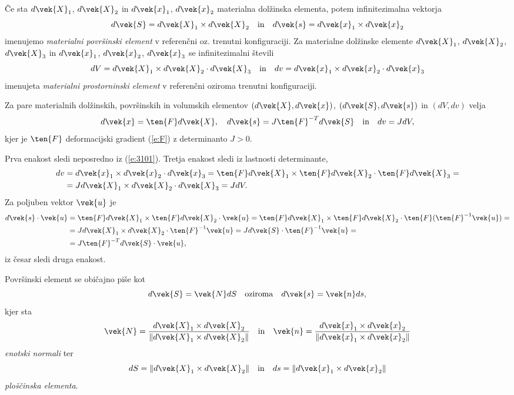 \begin{definicija}
	Če sta $d\vek{X}_1$, $d\vek{X}_2$ in $d\vek{x}_1$, $d\vek{x}_2$ materialna dolžinska elementa,
	potem infinitezimalna vektorja
	\[ d\vek{S}= d\vek{X}_1\times d\vek{X}_2\quad\mathrm{in}\quad d\vek{s}= d\vek{x}_1\times d\vek{x}_2 \]
	imenujemo \emph{materialni površinski element} v referenčni oz. trenutni konfiguraciji.
	Za materialne dolžinske elemente $d\vek{X}_1$, $d\vek{X}_2$, $d\vek{X}_3$
	in $d\vek{x}_1$, $d\vek{x}_2$, $d\vek{x}_3$ se infinitezimalni števili
	\[ dV= d\vek{X}_1\times d\vek{X}_2\cdot d\vek{X}_3\quad\mathrm{in}\quad dv= d\vek{x}_1\times d\vek{x}_2\cdot d\vek{x}_3 \]
	imenujeta \emph{materialni prostorninski element} v referenčni oziroma trenutni konfiguraciji.
\end{definicija}
\begin{trditev}
	Za pare materialnih dolžinskih, površinskih in volumskih elementov $(d\vek{X},d\vek{x})$, $(d\vek{S},d\vek{s})$ in $(dV,dv)$ velja
	\begin{equation}\label{e:dxdX}
		d\vek{x}=\ten{F}d\vek{X},\quad d\vek{s}=J\ten{F}^{-T}d\vek{S}\quad\mathrm{in}\quad
		dv=JdV,
	\end{equation}
	kjer je $\ten{F}$ deformacijski gradient (\ref{e:F}) z determinanto $J>0$.
\end{trditev}
\proof
	Prva enakost sledi neposredno iz (\ref{e:3101}). Tretja enakost sledi iz lastnosti determinante,
	\begin{align*}
		dv&=d\vek{x}_1\times d\vek{x}_2\cdot d\vek{x}_3=
		\ten{F}d\vek{X}_1\times \ten{F}d\vek{X}_2\cdot \ten{F}d\vek{X}_3=\\
		&=Jd\vek{X}_1\times d\vek{X}_2\cdot d\vek{X}_3 = JdV.
	\end{align*}
	Za poljuben vektor $\vek{u}$ je
	\begin{align*}
		d\vek{s}\cdot\vek{u}&=\ten{F}d\vek{X}_1\times\ten{F}d\vek{X}_2\cdot\vek{u}=
		\ten{F}d\vek{X}_1\times\ten{F}d\vek{X}_2\cdot\ten{F}(\ten{F}^{-1}\vek{u})=\\
		&=J d\vek{X}_1\times d\vek{X}_2 \cdot \ten{F}^{-1}\vek{u} =J d\vek{S}\cdot\ten{F}^{-1}\vek{u}=\\
		&=J\ten{F}^{-T}d\vek{S}\cdot\vek{u},
	\end{align*}
	iz česar sledi druga enakost. 
\endproof

Površinski element se običajno piše kot
\[ d\vek{S}=\vek{N}dS \quad\mathrm{oziroma}\quad d\vek{s}=\vek{n}ds, \]
kjer sta
\[
	\vek{N}=\frac{d\vek{X}_1\times d\vek{X}_2}{\|d\vek{X}_1\times d\vek{X}_2\|} \quad\mathrm{in}\quad
	\vek{n}=\frac{d\vek{x}_1\times d\vek{x}_2}{\|d\vek{x}_1\times d\vek{x}_2\|}
\]
\emph{enotski normali} ter
\[ dS=\|d\vek{X}_1\times d\vek{X}_2\| \quad\mathrm{in}\quad ds=\|d\vek{x}_1\times d\vek{x}_2\| \]
\emph{ploščinska elementa}.


